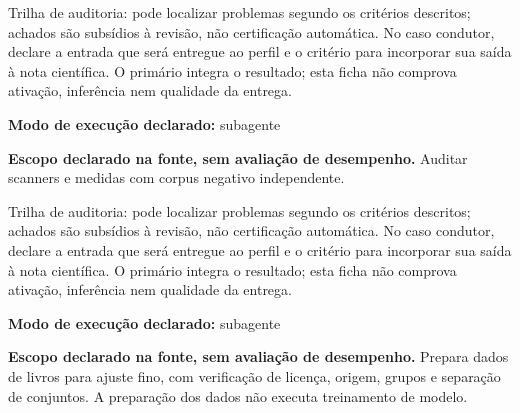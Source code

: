 \begin{funcao}
Trilha de auditoria: pode localizar problemas segundo os critérios descritos; achados são subsídios à revisão, não certificação automática. No caso condutor, declare a entrada que será entregue ao perfil e o critério para incorporar sua saída à nota científica. O primário integra o resultado; esta ficha não comprova ativação, inferência nem qualidade da entrega.
\end{funcao}

\begin{arquitetura}
\textbf{Modo de execução declarado:} subagente
\end{arquitetura}


\begin{descricao}
\textbf{Escopo declarado na fonte, sem avaliação de desempenho.}
Auditar scanners e medidas com corpus negativo independente.
\end{descricao}

\begin{funcao}
Trilha de auditoria: pode localizar problemas segundo os critérios descritos; achados são subsídios à revisão, não certificação automática. No caso condutor, declare a entrada que será entregue ao perfil e o critério para incorporar sua saída à nota científica. O primário integra o resultado; esta ficha não comprova ativação, inferência nem qualidade da entrega.
\end{funcao}

\begin{arquitetura}
\textbf{Modo de execução declarado:} subagente
\end{arquitetura}


\begin{descricao}
\textbf{Escopo declarado na fonte, sem avaliação de desempenho.}
Prepara dados de livros para ajuste fino, com verificação de licença, origem, grupos e separação de conjuntos. A preparação dos dados não executa treinamento de modelo.
\end{descricao}

